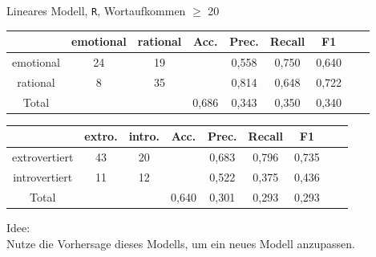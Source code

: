 \begin{frame}
Lineares Modell, \texttt{R}, Wortaufkommen $\geq$ 20\\
\vspace{12pt}
\begin{center}
\begin{tabular}{|c|c|c|c|c|c|c|c|c|}
\hline
				& emotional 	& rational	&  Acc.	& Prec. & Recall	& F1\\
\hline
emotional 		& 24			& 19 		&       & 0,558	& 0,750 	& 0,640\\
rational	 	& 8 			& 35		& 		& 0,814	& 0,648 	& 0,722\\
\hline
Total 			& 				& 			& 0,686	& 0,343	& 0,350  	& 0,340\\
\hline
\end{tabular}
\end{center}

\begin{center}
\begin{tabular}{|c|c|c|c|c|c|c|c|c|}
\hline
				& extro. 	& intro.	&  Acc.	& Prec. 	& Recall	& F1\\
\hline
extrovertiert	& 43		& 20		&       & 0,683 	& 0,796 	& 0,735\\
introvertiert 	& 11 		& 12		& 		& 0,522 	& 0,375 	& 0,436\\
\hline
Total 			& 			& 			& 0,640	& 0,301		& 0,293  	& 0,293\\
\hline
\end{tabular}
 \end{center}

 \vspace{12pt}
 
 Idee:\\
 Nutze die Vorhersage dieses Modells, um ein neues Modell anzupassen. 
 \end{frame}


